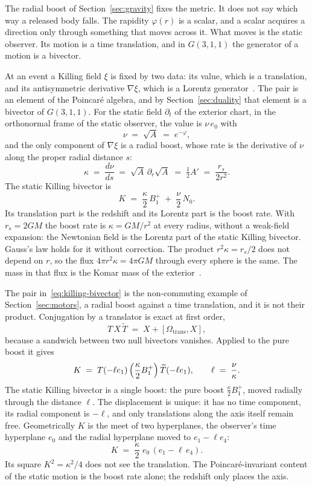 \documentclass[a4paper]{article}
\begin{document}
The radial boost of Section~\ref{sec:gravity} fixes the metric. It does not say which way a released body falls. The rapidity \(\varphi(r)\) is a scalar, and a scalar acquires a direction only through something that moves across it. What moves is the static observer. Its motion is a time translation, and in \(G(3,1,1)\) the generator of a motion is a bivector.

At an event a Killing field \(\xi\) is fixed by two data: its value, which is a translation, and its antisymmetric derivative \(\nabla\xi\), which is a Lorentz generator~\cite{Wald1984}. The pair is an element of the Poincar\'{e} algebra, and by Section~\ref{sec:duality} that element is a bivector of \(G(3,1,1)\). For the static field \(\partial_{t}\) of the exterior chart, in the orthonormal frame of the static observer, the value is \(\nu\,e_{0}\) with
\[
\nu \;=\; \sqrt{A} \;=\; e^{-\varphi},
\]
and the only component of \(\nabla\xi\) is a radial boost, whose rate is the derivative of \(\nu\) along the proper radial distance \(s\):
\[
\kappa \;=\; \frac{d\nu}{ds} \;=\; \sqrt{A}\,\partial_{r}\sqrt{A} \;=\; \tfrac12 A' \;=\; \frac{r_{s}}{2r^{2}}.
\]
The static Killing bivector is
\begin{equation}
K \;=\; \frac{\kappa}{2}\,B^{+}_{1} \;+\; \frac{\nu}{2}\,N_{0}.
\label{eq:killing-bivector}
\end{equation}
Its translation part is the redshift and its Lorentz part is the boost rate. With \(r_{s}=2GM\) the boost rate is \(\kappa=GM/r^{2}\) at every radius, without a weak-field expansion: the Newtonian field is the Lorentz part of the static Killing bivector. Gauss's law holds for it without correction. The product \(r^{2}\kappa=r_{s}/2\) does not depend on \(r\), so the flux \(4\pi r^{2}\kappa=4\pi GM\) through every sphere is the same. The mass in that flux is the Komar mass of the exterior~\cite{Komar1959}.

The pair in~\eqref{eq:killing-bivector} is the non-commuting example of Section~\ref{sec:motors}, a radial boost against a time translation, and it is not their product. Conjugation by a translator is exact at first order,
\[
T\,X\,\widetilde{T} \;=\; X + [\Omega_{\mathrm{trans}},X],
\]
because a sandwich between two null bivectors vanishes. Applied to the pure boost it gives
\begin{equation}
K \;=\; T(-\ell e_{1})\,\Bigl(\frac{\kappa}{2}B^{+}_{1}\Bigr)\,\widetilde{T}(-\ell e_{1}),
\qquad
\ell \;=\; \frac{\nu}{\kappa}.
\label{eq:displaced-boost}
\end{equation}
The static Killing bivector is a single boost: the pure boost \(\tfrac{\kappa}{2}B^{+}_{1}\), moved radially through the distance \(\ell\). The displacement is unique: it has no time component, its radial component is \(-\ell\), and only translations along the axis itself remain free. Geometrically \(K\) is the meet of two hyperplanes, the observer's time hyperplane \(e_{0}\) and the radial hyperplane moved to \(e_{1}-\ell e_{4}\):
\[
K \;=\; \frac{\kappa}{2}\;e_{0}\,(e_{1}-\ell\,e_{4}).
\]
Its square \(K^{2}=\kappa^{2}/4\) does not see the translation. The Poincar\'{e}-invariant content of the static motion is the boost rate alone; the redshift only places the axis.
\end{document}
